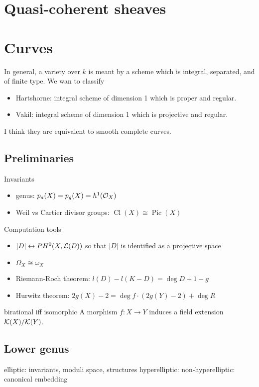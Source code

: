 \documentclass{../../large}
\newcommand{\Cl}{\operatorname{Cl}}
\newcommand{\Pic}{\operatorname{Pic}}
\begin{document}
\chapter{Quasi-coherent sheaves}



\chapter{Curves}


In general, a variety over $k$ is meant by a scheme which is integral, separated, and of finite type.
We wan to classify 
\begin{itemize}
\item Hartshorne: integral scheme of dimension 1 which is proper and regular.
\item Vakil: integral scheme of dimension 1 which is projective and regular.
\end{itemize}
I think they are equivalent to smooth complete curves.

\section{Preliminaries}
Invariants
\begin{itemize}
\item genus: $p_a(X)=p_g(X)=h^1(\mathcal{O}_X)$
\item Weil vs Cartier divisor groups: $\Cl(X)\cong\Pic(X)$
\end{itemize}

Computation tools
\begin{itemize}
\item $|D|\leftrightarrow PH^0(X,\mathcal{L}(D))$ so that $|D|$ is identified as a projective space
\item $\Omega_X\cong\omega_X$
\item Riemann-Roch theorem: $l(D)-l(K-D)=\deg D+1-g$
\item Hurwitz theorem: $2g(X)-2=\deg f\cdot(2g(Y)-2)+\deg R$
\end{itemize}


birational iff isomorphic
A morphism $f:X\to Y$ induces a field extension $\mathcal{K}(X)/\mathcal{K}(Y)$.

\section{Lower genus}
elliptic: invariants, moduli space, structures
hyperelliptic: 
non-hyperelliptic: canonical embedding
\end{document}
